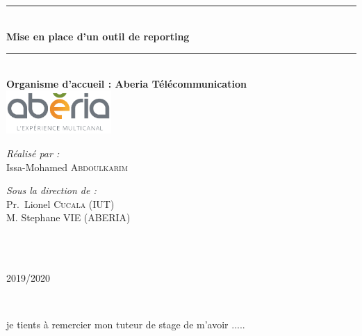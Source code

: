 \documentclass[a4paper,12pt]{report}
\begin{document}
\begin{titlepage}
\begin{center}
\rule{\linewidth}{0.3mm} \\[0.4cm]
{ \huge \bfseries\color{blue!70!black} Mise en place d'un outil de reporting  \\[0.4cm] }
\rule{\linewidth}{0.3mm} \\[1cm]
{\large \bfseries Organisme d'accueil : Aberia Télécommunication}\\[1cm]
 \includegraphics[width=0.3\textwidth]{image/aberia}\\[1cm]
\noindent
\begin{minipage}{0.4\textwidth}
  \begin{flushleft} \large
    \emph{\color{orange!80!black}Réalisé par :}\\
    Issa-Mohamed \textsc{Abdoulkarim}\\
  \end{flushleft}
\end{minipage}%
\begin{minipage}{0.5\textwidth}
  \begin{flushright} \large
    \emph{\color{orange!80!black}Sous la direction de :} \\
    Pr.~Lionel \textsc{Cucala} (IUT)\\
    M. Stephane \textsc{VIE} (ABERIA)\\
  \end{flushright}
\end{minipage}\\[1cm]

\color{black}
\centering

{\large \color{orange!80!black}{Année universitaire}\\ \color{blue!80!black}2019/2020}

\end{center}
\end{titlepage}

\newpage
\strut 
\newpage

~
\vfill
 
je tients à remercier mon tuteur de stage de m'avoir .....
 
\end{document}
